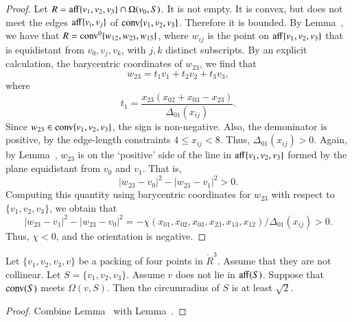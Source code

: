 \begin{tarskidata}
\begin{tarski}
\begin{proof} Let $R = {\operatorname{aff}}\{v_1,v_2,v_3\}\cap\Omega(v_0,S)$.
It is not empty.  It is convex, but does not meet the edges
${\operatorname{aff}}\{v_i,v_j\}$ of ${\operatorname{conv}}\{v_1,v_2,v_3\}$.  Therefore it
is bounded.  By Lemma~, we have that
$R = {\operatorname{conv}}^0\{w_{12},w_{23},w_{13}\}$, where $w_{ij}$ is the point
on ${\operatorname{aff}}\{v_1,v_2,v_3\}$ that is equidistant from $v_0,v_j,v_k$,
with $j,k$ distinct subscripts.  By an explicit calculation,
the barycentric coordinates of $w_{23}$, we find that
   $$w_{23} = t_1 v_1 + t_2 v_2 + t_3 v_3,$$
where $$t_1 = \frac{x_{23} (x_{02} + x_{03} - x_{23})}{\Delta_{01}(x_{ij})}.$$
Since $w_{23}\in{\operatorname{conv}}\{v_1,v_2,v_3\}$, the sign is non-negative.
Also, the demoninator is positive, by the edge-length constraints
$4\le x_{ij} < 8$.  Thus, $\Delta_{01}(x_{ij}) > 0$.
Again, by Lemma~, $w_{23}$ is on the `positive'
side of the line in ${\operatorname{aff}}\{v_1,v_2,v_3\}$ formed by the plane
equidistant from $v_0$ and $v_1$.  That is,
   $$|w_{23}-v_0|^2 - |w_{23}-v_1|^2 > 0.$$
Computing this quantity using barycentric coordinates for $w_{23}$
with respect
to $\{v_1,v_2,v_3\}$, we obtain that
   $$|w_{23}-v_1|^2 - |w_{23}-v_0|^2 = 
   -\chi(x_{01},x_{02},x_{03},x_{23},x_{13},x_{12})/{\Delta_{01}(x_{ij})} >0.$$
Thus, $\chi < 0$, and the orientation is negative.
\end{proof}
\end{tarski}







\begin{tarski}

\begin{lemma}
Let $\{v_1,v_2,v_3,v\}$ be a packing of four points in $\ring{R}^3$.
Assume that they are not collinear.
Let $S=\{v_1,v_2,v_3\}$.
Assume $v$ does not lie in ${\operatorname{aff}}(S)$.  Suppose that
${\operatorname{conv}}(S)$ meets $\Omega(v,S)$.  Then the circumradius
of $S$ is at least $\sqrt2$.
\end{lemma}

\begin{proof} Combine Lemma~ with
Lemma~.
\end{proof}
\end{tarski}




\end{tarskidata}
